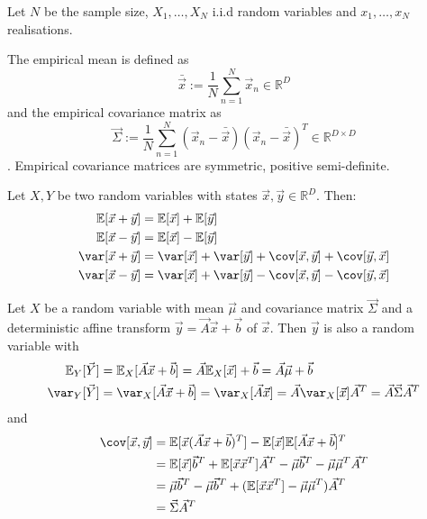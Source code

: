 Let $N$ be the sample size, $X_1, \dotsc, X_N$ i.i.d random variables
and $x_1, \dotsc, x_N$ realisations.

The empirical mean is defined as
\begin{equation*}
    \bar{\vec{x}} := \frac{1}{N}\sum_{n = 1}^N{\vec{x}_n}
    \in \mathbb{R}^D
\end{equation*}
and the empirical covariance matrix as
\begin{equation*}
    \vec{\Sigma} :=
    \frac{1}{N} \sum_{n = 1}^N{
        (\vec{x}_n - \bar{\vec{x}})(\vec{x}_n - \bar{\vec{x}})^T
    }
    \in \mathbb{R}^{D \times D}
\end{equation*}.
Empirical covariance matrices are symmetric, positive semi-definite.

Let $X, Y$ be two random variables with states
$\vec{x}, \vec{y} \in \mathbb{R}^D$.
Then:
\begin{align*}
    \mathbb{E}[\vec{x} + \vec{y}] &= \mathbb{E}[\vec{x}] + \mathbb{E}[\vec{y}] \\
    \mathbb{E}[\vec{x} - \vec{y}] &= \mathbb{E}[\vec{x}] - \mathbb{E}[\vec{y}] \\
    \var[\vec{x} + \vec{y}] &= \var[\vec{x}] + \var[\vec{y}] + \cov[\vec{x}, \vec{y}] + \cov[\vec{y}, \vec{x}] \\
    \var[\vec{x} - \vec{y}] &= \var[\vec{x}] + \var[\vec{y}] - \cov[\vec{x}, \vec{y}] - \cov[\vec{y}, \vec{x}]
\end{align*}

Let $X$ be a random variable with mean $\vec{\mu}$ and
covariance matrix $\vec{\Sigma}$ and a deterministic affine
transform $\vec{y} = \vec{A} \vec{x} + \vec{b}$ of $\vec{x}$.
Then $\vec{y}$ is also a random variable with
\begin{align*}
    \mathbb{E}_Y[\vec{Y}] &=
        \mathbb{E}_X[\vec{A} \vec{x} + \vec{b}] =
        \vec{A} \mathbb{E}_X[\vec{x}] + \vec{b} =
        \vec{A} \vec{\mu} + \vec{b} \\
    \var_Y[\vec{Y}] &=
        \var_X[\vec{A} \vec{x} + \vec{b}] =
        \var_X[\vec{A} \vec{x}] =
        \vec{A} \var_X[\vec{x}] \vec{A}^T =
        \vec{A} \vec{\Sigma} \vec{A}^T
\end{align*}
and
\begin{align*}
    \cov[\vec{x}, \vec{y}] &=
        \mathbb{E}[\vec{x}(\vec{A} \vec{x} + \vec{b})^T]
        - \mathbb{E}[\vec{x}]\mathbb{E}[\vec{A} \vec{x} + \vec{b}]^T \\
    &= \mathbb{E}[\vec{x}]\vec{b}^T + \mathbb{E}[\vec{x}\vec{x}^T]\vec{A}^T - \vec{\mu}\vec{b}^T - \vec{\mu}\vec{\mu}^T\vec{A}^T \\
    &= \vec{\mu}\vec{b}^T - \vec{\mu}\vec{b}^T + (\mathbb{E}[\vec{x}\vec{x}^T] - \vec{\mu}\vec{\mu}^T)\vec{A}^T \\
    &= \vec{\Sigma}\vec{A}^T
\end{align*}

